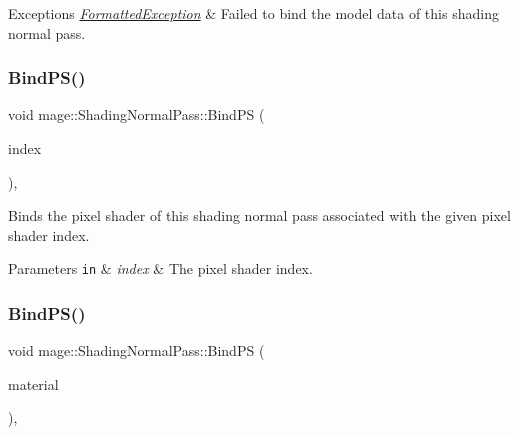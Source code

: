 \begin{DoxyExceptions}{Exceptions}
{\em \hyperlink{structmage_1_1_formatted_exception}{Formatted\+Exception}} & Failed to bind the model data of this shading normal pass. \\
\hline
\end{DoxyExceptions}
\hypertarget{classmage_1_1_shading_normal_pass_ab691c2125f9e21c7e70f2737037504bc}{}\label{classmage_1_1_shading_normal_pass_ab691c2125f9e21c7e70f2737037504bc} 
\subsubsection{\texorpdfstring{Bind\+P\+S()}{BindPS()}\hspace{0.1cm}{\footnotesize\ttfamily [1/2]}}
{\footnotesize\ttfamily void mage\+::\+Shading\+Normal\+Pass\+::\+Bind\+PS (\begin{DoxyParamCaption}\item[{\hyperlink{classmage_1_1_shading_normal_pass_a6d277753d26a7854c448b3e0d9275b19}{P\+S\+Index}}]{index }\end{DoxyParamCaption})\hspace{0.3cm}{\ttfamily [private]}, {\ttfamily [noexcept]}}

Binds the pixel shader of this shading normal pass associated with the given pixel shader index.


\begin{DoxyParams}[1]{Parameters}
\mbox{\tt in}  & {\em index} & The pixel shader index. \\
\hline
\end{DoxyParams}
\hypertarget{classmage_1_1_shading_normal_pass_af8ef8987bda86646712780b5cfad0b72}{}\label{classmage_1_1_shading_normal_pass_af8ef8987bda86646712780b5cfad0b72} 
\subsubsection{\texorpdfstring{Bind\+P\+S()}{BindPS()}\hspace{0.1cm}{\footnotesize\ttfamily [2/2]}}
{\footnotesize\ttfamily void mage\+::\+Shading\+Normal\+Pass\+::\+Bind\+PS (\begin{DoxyParamCaption}\item[{const \hyperlink{structmage_1_1_material}{Material} $\ast$}]{material }\end{DoxyParamCaption})\hspace{0.3cm}{\ttfamily [private]}, {\ttfamily [noexcept]}}

